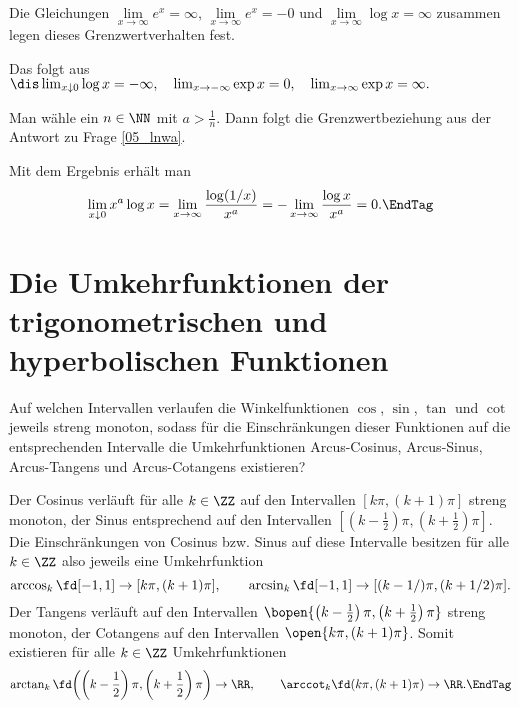 \begin{antwort}
   Die Gleichungen 
  $\lim\limits_{x\to\infty} e^x=\infty$, 
  $\lim\limits_{x\to\infty} e^x=-0$ und 
  $\lim\limits_{x\to\infty} \log x=\infty$ zusammen legen dieses 
  Grenzwertverhalten fest.

  \medskip
  \noindent
   Das folgt aus $\dis 
  \lim_{x\downarrow 0} \log x =-\infty,\quad
  \lim_{x\to -\infty} \exp x = 0, \quad
  \lim_{x\to\infty} \exp x = \infty.$

  \medskip
  \noindent
   Man wähle ein $n\in \NN$ mit $a > \frac{1}{n}$. Dann folgt 
  die Grenzwertbeziehung aus der Antwort zu Frage \ref{05_lnwa}. 

  \medskip
  \noindent
   Mit dem Ergebnis  erhält man  
  \begin{equation}
    \lim_{x\downarrow 0} x^a \log x = 
    \lim_{x\to\infty} \frac{\log(1/x)}{x^a} 
    = - \lim_{x\to\infty} \frac{\log x}{x^a} = 0.
    \EndTag
  \end{equation}
\end{antwort}


\section{Die Umkehrfunktionen der trigonometrischen und 
  hyperbolischen Funktionen}

\begin{frage}
  Auf welchen Intervallen verlaufen die Winkelfunktionen 
  $\cos$, $\sin$, $\tan$ und $\cot$ jeweils streng monoton, 
  sodass für die Einschränkungen dieser 
  Funktionen auf die entsprechenden Intervalle die 
  Umkehrfunktionen Arcus-Cosinus, Arcus-Sinus, Arcus-Tangens 
  und Arcus-Cotangens existieren?
\end{frage}

\begin{antwort}
  Der Cosinus verläuft für alle $k\in\ZZ$ 
  auf den Intervallen $[k\pi, (k+1)\pi]$ streng monoton, 
  der Sinus entsprechend auf den Intervallen 
  $\left[\left( k-\frac{1}{2} \right)\pi,\left(k+\frac{1}{2}\right)\pi\right]$. 
  Die Einschränkungen von Cosinus bzw. Sinus auf diese Intervalle 
  besitzen für alle $k\in\ZZ$ also jeweils eine Umkehrfunktion
  \[
  \arccos_k\fd [-1,1] \to [k\pi, (k+1)\pi],\qquad
  \arcsin_k\fd [-1,1] \to [(k-1/)\pi, (k+1/2)\pi].
  \]
  Der Tangens verläuft auf den Intervallen 
  $\bopen{\left( k-\frac{1}{2} \right)\pi,\left(k+\frac{1}{2}\right)\pi}$
  streng monoton, der Cotangens auf den Intervallen 
  $\open{ k\pi,(k+1)\pi }$. Somit existieren für 
  alle $k\in \ZZ$ Umkehrfunktionen
  \[
  \arctan_k\fd 
  \text{$\left(\left( k-\frac{1}{2} \right)\pi,
      \left(k+\frac{1}{2}\right)\pi\right)$} \to \RR,\qquad
  \arccot_k\fd (k\pi, (k+1)\pi) \to \RR.\EndTag
  \]
\end{antwort}



